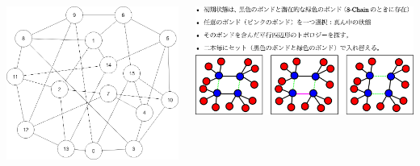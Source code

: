 \documentclass[12pt, dvipdfmx]{beamer}
\begin{document}
\begin{frame}
\begin{columns}[T, onlytextwidth]
				\vspace{-5mm}
				\begin{center}
					\includegraphics[width=.6\textwidth]{Network.png}
				\end{center}
				\includegraphics[width=\textwidth]{bond_exchg.png}
		\end{columns}
\end{frame}
\end{document}
